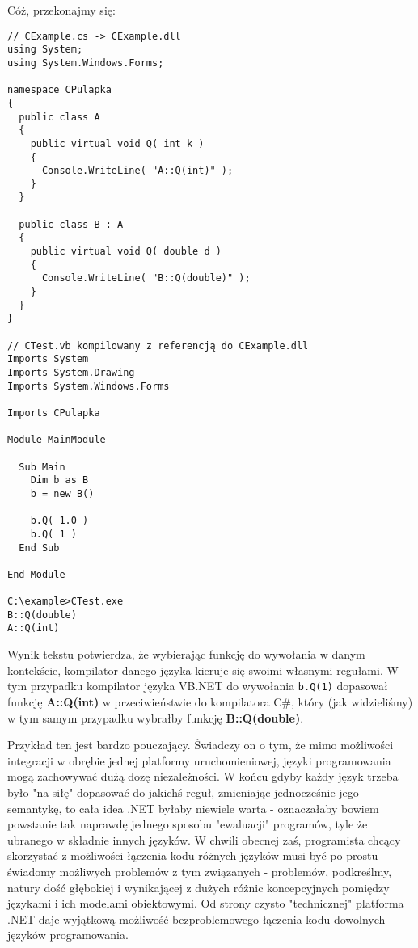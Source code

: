 Cóż, przekonajmy się:

\begin{scriptsize}
\begin{verbatim}
// CExample.cs -> CExample.dll
using System;
using System.Windows.Forms;

namespace CPulapka
{
  public class A 
  {
    public virtual void Q( int k )
    {
      Console.WriteLine( "A::Q(int)" );
    }  
  }

  public class B : A
  {
    public virtual void Q( double d )
    {
      Console.WriteLine( "B::Q(double)" );
    }  
  }
}

// CTest.vb kompilowany z referencją do CExample.dll
Imports System
Imports System.Drawing
Imports System.Windows.Forms

Imports CPulapka

Module MainModule

  Sub Main
    Dim b as B
    b = new B()

    b.Q( 1.0 )
    b.Q( 1 )
  End Sub
	
End Module

C:\example>CTest.exe
B::Q(double)
A::Q(int)
\end{verbatim}
\end{scriptsize}

Wynik tekstu potwierdza, że wybierając funkcję do wywołania w danym kontekście, kompilator
danego języka kieruje się swoimi własnymi regułami. W tym przypadku kompilator języka VB.NET
do wywołania {\tt b.Q(1)} dopasował funkcję {\bf A::Q(int)} w przeciwieństwie do kompilatora C\#, który
(jak widzieliśmy) w tym samym przypadku wybrałby funkcję {\bf B::Q(double)}.

Przykład ten jest bardzo pouczający. Świadczy on o tym, że mimo możliwości integracji w obrębie jednej
platformy uruchomieniowej, języki programowania mogą zachowywać dużą dozę niezależności. W końcu gdyby
każdy język trzeba było "na siłę" dopasować do jakichś reguł, zmieniając jednocześnie jego semantykę,
to cała idea .NET byłaby niewiele warta - oznaczałaby bowiem powstanie tak naprawdę jednego sposobu
"ewaluacji" programów, tyle że ubranego w składnie innych języków. W chwili obecnej zaś, programista 
chcący skorzystać z możliwości łączenia kodu różnych języków musi być po prostu świadomy możliwych
problemów z tym związanych - problemów, podkreślmy, natury dość głębokiej i wynikającej z dużych
różnic koncepcyjnych pomiędzy językami i ich modelami obiektowymi. Od strony czysto "technicznej"
platforma .NET daje wyjątkową możliwość bezproblemowego łączenia kodu dowolnych języków programowania.